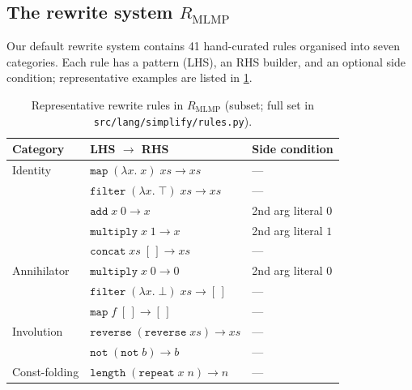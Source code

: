 \documentclass[12pt]{article}
\begin{document}
\subsection{The rewrite system $R_{\text{MLMP}}$}\label{app:rules}

Our default rewrite system contains 41 hand-curated rules organised into seven categories. Each rule has a pattern (LHS), an RHS builder, and an optional side condition; representative examples are listed in \cref{tab:rules}.

\begin{table}[!htbp]
\centering
\caption{Representative rewrite rules in $R_{\text{MLMP}}$ (subset; full set in \texttt{src/lang/simplify/rules.py}).}
\label{tab:rules}
\small
\begin{tabular}{lll}
\toprule
Category & LHS $\to$ RHS & Side condition \\
\midrule
Identity      & $\mathtt{map}\;(\lambda x.\;x)\;\mathit{xs} \to \mathit{xs}$                         & --- \\
              & $\mathtt{filter}\;(\lambda x.\;\top)\;\mathit{xs} \to \mathit{xs}$                  & --- \\
              & $\mathtt{add}\;x\;0 \to x$                                                          & 2nd arg literal $0$ \\
              & $\mathtt{multiply}\;x\;1 \to x$                                                     & 2nd arg literal $1$ \\
              & $\mathtt{concat}\;\mathit{xs}\;[\,] \to \mathit{xs}$                                & --- \\
Annihilator   & $\mathtt{multiply}\;x\;0 \to 0$                                                     & 2nd arg literal $0$ \\
              & $\mathtt{filter}\;(\lambda x.\;\bot)\;\mathit{xs} \to [\,]$                         & --- \\
              & $\mathtt{map}\;f\;[\,] \to [\,]$                                                    & --- \\
Involution    & $\mathtt{reverse}\;(\mathtt{reverse}\;\mathit{xs}) \to \mathit{xs}$                  & --- \\
              & $\mathtt{not}\;(\mathtt{not}\;b) \to b$                                              & --- \\
Const-folding & $\mathtt{length}\;(\mathtt{repeat}\;x\;n) \to n$                                     & --- \\

\end{tabular}
\end{table}
\end{document}
